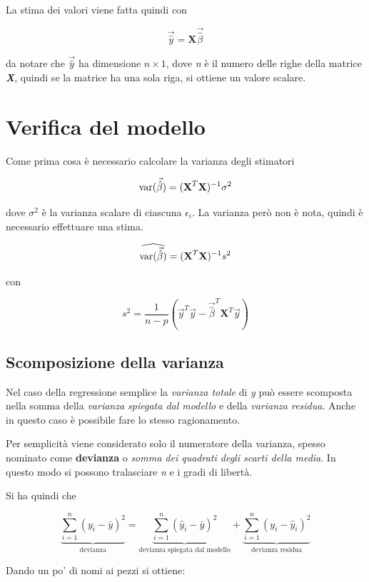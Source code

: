 La stima dei valori viene fatta quindi con 

$$
\vec{\hat{y}} = \textbf{X}\vec{\hat{\beta}}
$$

da notare che $ \vec{\hat{y}} $ ha dimensione $ n \times 1 $, dove \textit{n} è il numero delle righe della matrice \textbf{\textit{X}}, quindi se la matrice ha una sola riga, si ottiene un valore scalare.

\section{Verifica del modello}

Come prima cosa è necessario calcolare la varianza degli stimatori

$$
\text{var}(\vec{\hat{\beta}}) = (\textbf{X}^T\textbf{X})^{-1}\sigma^2
$$

dove $ \sigma^2 $ è la varianza scalare di ciascuna $ \epsilon_i $.
La varianza però non è nota, quindi è necessario effettuare una stima.

$$
\widehat{\text{var}(\vec{\hat{\beta}})} = (\textbf{X}^T\textbf{X})^{-1}s^2
$$

con

$$
s^2 = \frac{1}{n - p}(\vec{y}^T\vec{y} - \vec{\hat{\beta}}^T \textbf{X}^T \vec{y})
$$

\subsection{Scomposizione della varianza}

Nel caso della regressione semplice la \textit{varianza totale} di \textit{y} può essere scomposta nella somma della \textit{varianza spiegata dal modello} e della \textit{varianza residua}. Anche in questo caso è possibile fare lo stesso ragionamento.

Per semplicità viene considerato solo il numeratore della varianza, spesso nominato come \textbf{devianza} o \textit{somma dei quadrati degli scarti della media}. In questo modo si possono tralasciare \textit{n} e i gradi di libertà.

Si ha quindi che 

$$
\underbrace{\sum\limits_{i=1}^n (y_i - \bar{y})^2}_{\text{devianza}} = \underbrace{\sum\limits_{i=1}^n (\hat{y}_i - \bar{y})^2}_{\text{devianza spiegata dal modello}} + \underbrace{\sum\limits_{i=1}^n (y_i - \hat{y}_i)^2}_{\text{devianza residua}}  
$$

Dando un po' di nomi ai pezzi si ottiene:

